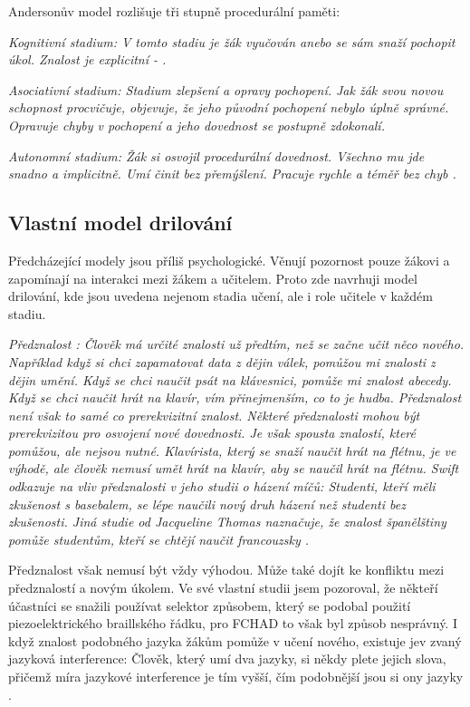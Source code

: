 Andersonův model rozlišuje tři stupně procedurální paměti:

\em Kognitivní stadium\em : V tomto stadiu je žák vyučován anebo se sám snaží pochopit úkol.  Znalost je explicitní - .

\em Asociativní stadium\em : Stadium zlepšení a opravy pochopení.  Jak žák svou novou schopnost procvičuje, objevuje, že jeho původní pochopení nebylo úplně správné.  Opravuje chyby v pochopení a jeho dovednost se postupně zdokonalí.

\em Autonomní stadium\em : Žák si osvojil procedurální dovednost. Všechno mu jde snadno a implicitně.  Umí činit bez přemýšlení. Pracuje rychle a téměř bez chyb \citep{o1987some}.

\subsection{Vlastní model drilování}

Předcházející modely jsou příliš psychologické.  Věnují pozornost pouze žákovi a zapomínají na interakci mezi žákem a učitelem.  Proto zde navrhuji model drilování, kde jsou uvedena nejenom stadia učení, ale i role učitele v každém stadiu.

\em Předznalost \em : Člověk má určité znalosti už předtím, než se začne učit něco nového. Například když si chci zapamatovat data z dějin válek, pomůžou mi znalosti z dějin umění.  Když se chci naučit psát na klávesnici, pomůže mi znalost abecedy. Když se chci naučit hrát na klavír, vím přinejmenším, co to je hudba.  Předznalost není však to samé co prerekvizitní znalost.  Některé předznalosti mohou být prerekvizitou pro osvojení nové dovednosti. Je však spousta znalostí, které pomůžou, ale nejsou nutné.  Klavírista, který se snaží naučit hrát na flétnu, je ve výhodě, ale člověk nemusí umět hrát na klavír, aby se naučil hrát na flétnu.  Swift odkazuje na vliv předznalosti v jeho studii o házení míčů: Studenti, kteří měli zkušenost s basebalem, se lépe naučili nový druh házení než studenti bez zkušenosti. Jiná studie od Jacqueline Thomas naznačuje, že znalost španělštiny pomůže studentům, kteří se chtějí naučit francouzsky \citep{swift1903studies,thomas1988role}.

Předznalost však nemusí být vždy výhodou. Může také dojít ke konfliktu mezi předznalostí a novým úkolem. Ve své vlastní studii jsem pozoroval, že někteří účastníci se snažili používat selektor způsobem, který se podobal použití piezoelektrického braillského řádku, pro FCHAD to však byl způsob nesprávný.  I když znalost podobného jazyka žákům pomůže v učení nového, existuje jev zvaný jazyková interference: Člověk, který umí dva jazyky, si někdy plete jejich slova, přičemž míra jazykové interference je tím vyšší, čím podobnější jsou si ony jazyky \citep{brauer1998stroop}.

